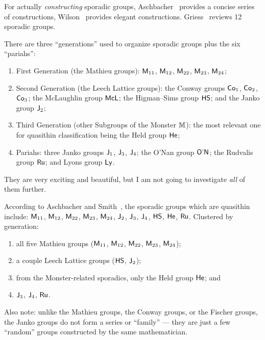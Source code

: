 \begin{def-remark}[References]
For actually \emph{constructing} sporadic groups,
Aschbacher~\cite{aschbacher1994sporadic} provides a concise series of
constructions, Wilson~\cite{wilson2009finite} provides elegant
constructions. Griess~\cite{griess1998twelve} reviews 12 sporadic
groups.
\end{def-remark}

\begin{def-remark}
There are three ``generations'' used to organize sporadic groups plus
the six ``pariahs'':
\begin{enumerate}
\item First Generation (the Mathieu groups): $\mathsf{M}_{11}$,
  $\mathsf{M}_{12}$, $\mathsf{M}_{22}$, $\mathsf{M}_{23}$, $\mathsf{M}_{24}$;
\item Second Generation (the Leech Lattice groups): the Conway groups
  $\mathsf{Co}_{1}$, $\mathsf{Co}_{2}$, $\mathsf{Co}_{3}$; the McLaughlin group
  $\mathsf{McL}$; the Higman--Sims group $\mathsf{HS}$; and the Janko
  group $\mathsf{J}_{2}$;
\item Third Generation (other Subgroups of the Monster $\mathbb{M}$): the most
  relevant one for quasithin classification being the Held group
  $\mathsf{He}$;
\item Pariahs: three Janko groups $\mathsf{J}_{1}$, $\mathsf{J}_{3}$, $\mathsf{J}_{4}$;
  the O'Nan group $\mathsf{O\textrm'N}$; the Rudvalis group $\mathsf{Ru}$; and Lyons
  group $\mathsf{Ly}$.
\end{enumerate}
They are very exciting and beautiful, but I am not going to investigate
\emph{all} of them further.
\end{def-remark}

\begin{def-remark}
According to Aschbacher and Smith~\cite{aschbacher2004classification1,aschbacher2004classification2}, the
sporadic groups which are quasithin include:
$\mathsf{M}_{11}$, $\mathsf{M}_{12}$, $\mathsf{M}_{22}$,
$\mathsf{M}_{23}$, $\mathsf{M}_{24}$, $\mathsf{J}_{2}$, $\mathsf{J}_{3}$, $\mathsf{J}_{4}$,
$\mathsf{HS}$, $\mathsf{He}$, $\mathsf{Ru}$. Clustered by generation:
\begin{enumerate}
\item all five Mathieu groups ($\mathsf{M}_{11}$, $\mathsf{M}_{12}$, $\mathsf{M}_{22}$, $\mathsf{M}_{23}$,
  $\mathsf{M}_{24}$);
\item a couple Leech Lattice groups ($\mathsf{HS}$, $\mathsf{J}_{2}$);
\item from the Monster-related sporadics, only the Held group $\mathsf{He}$; and
\item $\mathsf{J}_{3}$, $\mathsf{J}_{4}$, $\mathsf{Ru}$.
\end{enumerate}
Also note: unlike the Mathieu groups, the Conway groups, or the Fischer
groups, the Janko groups do not form a series or ``family'' --- they are
just a few ``random'' groups constructed by the same mathematician.
\end{def-remark}

